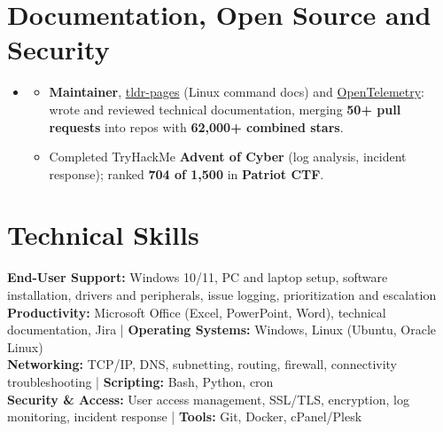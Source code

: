 \documentclass[a4paper]{article}
\begin{document}
\section{Documentation, Open Source and Security}
\begin{itemize}[leftmargin=0.15in, label={}, parsep=0pt]
\item
\small
\begin{itemize}[noitemsep, topsep=0pt]
    \item \textbf{Maintainer}, \href{https://github.com/tldr-pages/tldr}{tldr-pages} (Linux command docs) and \href{https://github.com/open-telemetry}{OpenTelemetry}: wrote and reviewed technical documentation, merging \textbf{50+ pull requests} into repos with \textbf{62,000+ combined stars}.
    \item Completed TryHackMe \textbf{Advent of Cyber} (log analysis, incident response); ranked \textbf{704 of 1,500} in \textbf{Patriot CTF}.
\end{itemize}
\end{itemize}


\section{Technical Skills}
\begin{itemize}[leftmargin=0.15in, label={}]
\small{\item{
\textbf{End-User Support:} Windows 10/11, PC and laptop setup, software installation, drivers and peripherals, issue logging, prioritization and escalation\\
\textbf{Productivity:} Microsoft Office (Excel, PowerPoint, Word), technical documentation, Jira \;|\; \textbf{Operating Systems:} Windows, Linux (Ubuntu, Oracle Linux)\\
\textbf{Networking:} TCP/IP, DNS, subnetting, routing, firewall, connectivity troubleshooting \;|\; \textbf{Scripting:} Bash, Python, cron\\
\textbf{Security \& Access:} User access management, SSL/TLS, encryption, log monitoring, incident response \;|\; \textbf{Tools:} Git, Docker, cPanel/Plesk
}}
\end{itemize}


\end{document}
